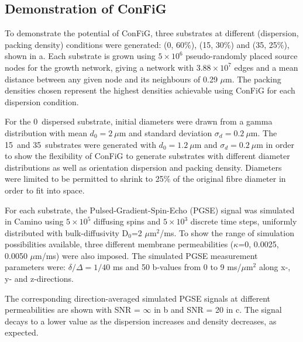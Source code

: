 \subsection{Demonstration of ConFiG}
\label{sec:method_demonstration}
To demonstrate the potential of ConFiG, three substrates at different (dispersion, packing density) conditions were generated: (0\degree, 60\%), (15\degree, 30\%) and (35\degree, 25\%), shown in a.
Each substrate is grown using $5 \times 10^6$ pseudo-randomly placed source nodes for the growth network, giving a network with $3.88\times10^7$  edges and a mean distance between any given node and its neighbours of 0.29 $\mu$m.
The packing densities chosen represent the highest densities achievable using ConFiG for each dispersion condition.


For the 0\degree\ dispersed substrate, initial diameters were drawn from a gamma distribution with mean $d_0 = 2\ \mu$m and standard deviation $\sigma_d = 0.2\ \mu$m. The 15\degree\ and 35\degree\ substrates were generated with $d_0 = 1.2\ \mu$m and $\sigma_d = 0.2\ \mu$m in order to show the flexibility of ConFiG to generate substrates with different diameter distributions as well as orientation dispersion and packing density. Diameters were limited to be permitted to shrink to 25\% of the original fibre diameter in order to fit into space. 

For each substrate, the Pulsed-Gradient-Spin-Echo (PGSE) signal was simulated in Camino\cite{Cook2006} using $5\times 10^5$ diffusing spins and $5\times 10^3$ discrete time steps, uniformly distributed with bulk-diffusivity D$_0$=2 $\mu$m$^2$/ms. To show the range of simulation possibilities available, three different membrane permeabilities ($\kappa$=0, 0.0025, 0.0050 $\mu$m/ms) were also imposed.
The simulated PGSE measurement parameters were: $\delta/\Delta=1/40$ ms and 50 b-values from 0 to 9 ms/$\mu$m$^2$ along x-, y- and z-directions.

The corresponding direction-averaged simulated PGSE signals at different permeabilities are shown with SNR = $\infty$ in b and SNR = 20 in c.
The signal decays to a lower value as the dispersion increases and density decreases, as expected. 

